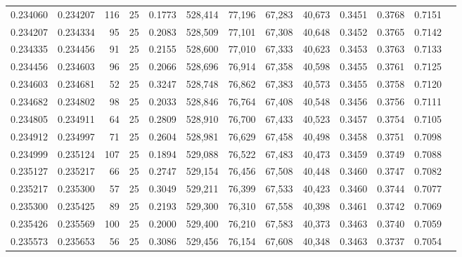 \begin{tabular}{rrrrrrrrrrrrr}
0.234060 & 0.234207 &   116 &  25 &                                     0.1773 & 528,414 &  77,196 &  67,283 &  40,673 & 0.3451 & 0.3768 & 0.7151 \\
0.234207 & 0.234334 &    95 &  25 &                                     0.2083 & 528,509 &  77,101 &  67,308 &  40,648 & 0.3452 & 0.3765 & 0.7142 \\
0.234335 & 0.234456 &    91 &  25 &                                     0.2155 & 528,600 &  77,010 &  67,333 &  40,623 & 0.3453 & 0.3763 & 0.7133 \\
0.234456 & 0.234603 &    96 &  25 &                                     0.2066 & 528,696 &  76,914 &  67,358 &  40,598 & 0.3455 & 0.3761 & 0.7125 \\
0.234603 & 0.234681 &    52 &  25 &                                     0.3247 & 528,748 &  76,862 &  67,383 &  40,573 & 0.3455 & 0.3758 & 0.7120 \\
0.234682 & 0.234802 &    98 &  25 &                                     0.2033 & 528,846 &  76,764 &  67,408 &  40,548 & 0.3456 & 0.3756 & 0.7111 \\
0.234805 & 0.234911 &    64 &  25 &                                     0.2809 & 528,910 &  76,700 &  67,433 &  40,523 & 0.3457 & 0.3754 & 0.7105 \\
0.234912 & 0.234997 &    71 &  25 &                                     0.2604 & 528,981 &  76,629 &  67,458 &  40,498 & 0.3458 & 0.3751 & 0.7098 \\
0.234999 & 0.235124 &   107 &  25 &                                     0.1894 & 529,088 &  76,522 &  67,483 &  40,473 & 0.3459 & 0.3749 & 0.7088 \\
0.235127 & 0.235217 &    66 &  25 &                                     0.2747 & 529,154 &  76,456 &  67,508 &  40,448 & 0.3460 & 0.3747 & 0.7082 \\
0.235217 & 0.235300 &    57 &  25 &                                     0.3049 & 529,211 &  76,399 &  67,533 &  40,423 & 0.3460 & 0.3744 & 0.7077 \\
0.235300 & 0.235425 &    89 &  25 &                                     0.2193 & 529,300 &  76,310 &  67,558 &  40,398 & 0.3461 & 0.3742 & 0.7069 \\
0.235426 & 0.235569 &   100 &  25 &                                     0.2000 & 529,400 &  76,210 &  67,583 &  40,373 & 0.3463 & 0.3740 & 0.7059 \\
0.235573 & 0.235653 &    56 &  25 &                                     0.3086 & 529,456 &  76,154 &  67,608 &  40,348 & 0.3463 & 0.3737 & 0.7054 \\

\end{tabular}
